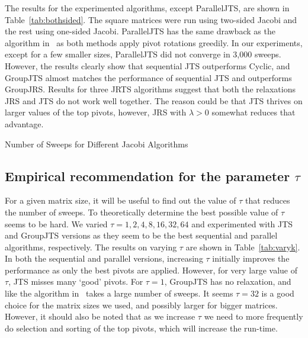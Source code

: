 \documentclass[10pt, conference, compsocconf]{IEEEtran}
\begin{document}
The results for the experimented algorithms, except ParallelJTS, are shown in Table~\ref{tab:bothsided}. The square matrices were run using two-sided Jacobi and the rest using one-sided Jacobi. ParallelJTS has the same drawback as the algorithm in~\cite{strumpen2003stream} as both methods apply pivot rotations greedily. In our experiments, except for a few smaller sizes, ParallelJTS did not converge in 3,000 sweeps. However, the results clearly show that sequential JTS outperforms Cyclic, and GroupJTS almost matches the performance of sequential JTS and outperforms GroupJRS. Results for three JRTS algorithms suggest that both the relaxations JRS and JTS do not work well together. The reason could be that JTS thrives on larger values of the top pivots, however, JRS with $\lambda > 0$ somewhat reduces that advantage.

\begin{table}
  \centering
  \caption{Number of Sweeps for Different Jacobi Algorithms}
  \label{tab:bothsided}
  
\end{table}


\subsection{Empirical recommendation for the parameter $\tau$}

For a given matrix size, it will be useful to find out the value of $\tau$ that reduces the number of sweeps. To theoretically determine the best possible value of $\tau$ seems to be hard. We varied $\tau{=}1,2,4,8,16,32,64$ and experimented with JTS and GroupJTS versions as they seem to be the best sequential and parallel algorithms, respectively. The results on varying $\tau$ are shown in Table~\ref{tab:varyk}. In both the sequential and parallel versions, increasing $\tau$ initially improves the performance as only the best pivots are applied. However, for very large value of $\tau$, JTS misses many `good' pivots. For $\tau{=}1$, GroupJTS has no relaxation, and like the algorithm in~\cite{strumpen2003stream} takes a large number of sweeps.  It seems $\tau{=}32$ is a good choice for the matrix sizes we used, and possibly larger for bigger matrices. However, it should also be noted that as we increase $\tau$ we need to more frequently do selection and sorting of the top pivots, which will increase the run-time. 
\end{document}
